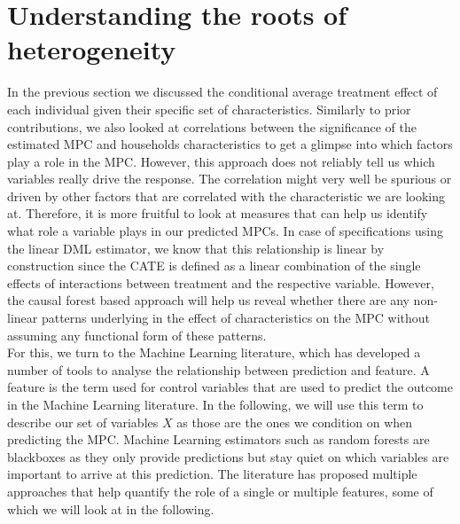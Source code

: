 \section{Understanding the roots of heterogeneity} \label{sec:roots_of_heterogeneity}
In the previous section we discussed the conditional average treatment effect of each individual given their specific set of characteristics. Similarly to prior contributions, we also looked at correlations between the significance of the estimated MPC and households characteristics to get a glimpse into which factors play a role in the MPC. However, this approach does not reliably tell us which variables really drive the response. The correlation might very well be spurious or driven by other factors that are correlated with the characteristic we are looking at. Therefore, it is more fruitful to look at measures that can help us identify what role a variable plays in our predicted MPCs. In case of specifications using the linear DML estimator, we know that this relationship is linear by construction since the CATE is defined as a linear combination of the single effects of interactions between treatment and the respective variable. However, the causal forest based approach will help us reveal whether there are any non-linear patterns underlying in the effect of characteristics on the MPC without assuming any functional form of these patterns. \\
For this, we turn to the Machine Learning literature, which has developed a number of tools to analyse the relationship between prediction and feature. A feature is the term used for control variables that are used to predict the outcome in the Machine Learning literature. In the following, we will use this term to describe our set of variables $X$ as those are the ones we condition on when predicting the MPC. Machine Learning estimators such as random forests are blackboxes as they only provide predictions but stay quiet on which variables are important to arrive at this prediction. The literature has proposed multiple approaches that help quantify the role of a single or multiple features, some of which we will look at in the following. 

